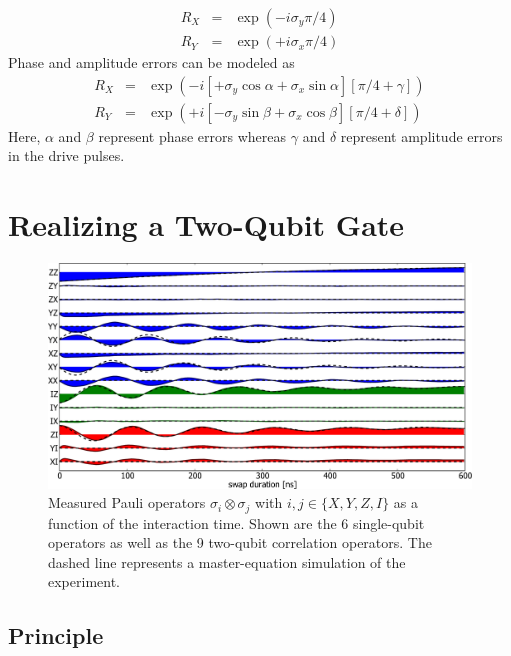 \begin{eqnarray}
R_{X} & = & \exp{\left( -i \sigma_y \pi / 4\right)} \\
R_{Y} & = & \exp{\left( +i \sigma_x \pi / 4\right)} 
\end{eqnarray}
Phase and amplitude errors can be modeled as
\begin{eqnarray}
R_{X} & = & \exp{\left( -i \left[+\sigma_y\cos{\alpha}+\sigma_x\sin{\alpha} \right] \left[\pi / 4+\gamma\right]\right)} \\
R_{Y} & = & \exp{\left( +i \left[-\sigma_y\sin{\beta}+\sigma_x\cos{\beta}\right] \left[\pi / 4+\delta\right]\right)} 
\end{eqnarray}
Here, $\alpha$ and $\beta$ represent phase errors whereas $\gamma$ and $\delta$ represent amplitude errors in the drive pulses.

\section{Realizing a Two-Qubit Gate}

\begin{figure}
   \centering
	 \includegraphics[width=1.\textwidth]{"./data/ct5/film of swap/pauli_set_vs_time_with_simulation"}
	 \caption[test]{Measured Pauli operators $\sigma_i \otimes \sigma_j$ with $i,j \in \{X,Y,Z,I\}$ as a function of the interaction time. Shown are the 6 single-qubit operators as well as the 9 two-qubit correlation operators. The dashed line represents a master-equation simulation of the experiment.}
	 \label{fig:swap_pauli_set_vs_time_with_simulation}
\end{figure}

\subsection{Principle}

